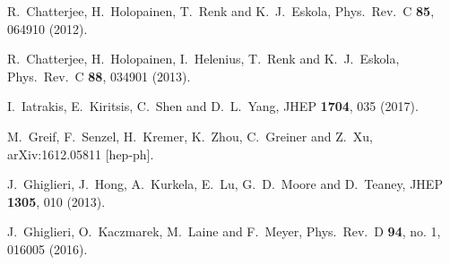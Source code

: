 \documentclass[aps,prc,a4paper,nofootinbib,
preprintnumbers,superscriptaddress,twocolumn,showpacs,showkeys]{revtex4}
\begin{document}
\begin{thebibliography}{99}
  R.~Chatterjee, H.~Holopainen, T.~Renk and K.~J.~Eskola,
  Phys.\ Rev.\ C {\bf 85}, 064910 (2012).

  R.~Chatterjee, H.~Holopainen, I.~Helenius, T.~Renk and K.~J.~Eskola,
  Phys.\ Rev.\ C {\bf 88}, 034901 (2013).

  I.~Iatrakis, E.~Kiritsis, C.~Shen and D.~L.~Yang,
  JHEP {\bf 1704}, 035 (2017).


  M.~Greif, F.~Senzel, H.~Kremer, K.~Zhou, C.~Greiner and Z.~Xu,
  arXiv:1612.05811 [hep-ph].
  
  
  J.~Ghiglieri, J.~Hong, A.~Kurkela, E.~Lu, G.~D.~Moore and D.~Teaney,
  JHEP {\bf 1305}, 010 (2013).
  
  J.~Ghiglieri, O.~Kaczmarek, M.~Laine and F.~Meyer,
  Phys.\ Rev.\ D {\bf 94}, no. 1, 016005 (2016).
  

\end{thebibliography}
\end{document}

